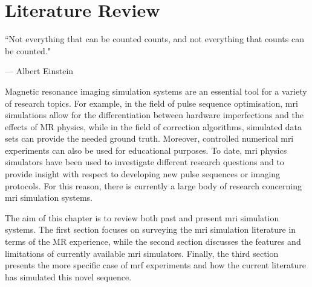 \chapter{Literature Review}
\label{chapterlabel2}
\epigraph{``Not everything that can be counted counts, and not everything that counts can
be counted."}{--- \textup{Albert Einstein}}

Magnetic resonance imaging simulation systems are an essential tool for a variety of research topics.
For example, in the field of pulse sequence optimisation, \ac{mri} simulations allow for the differentiation between hardware imperfections and the effects of MR physics, 
while in the field of correction algorithms, simulated data sets can provide the needed ground truth.
Moreover, controlled numerical \ac{mri} experiments can also be used for educational purposes.
To date, \ac{mri} physics simulators have been used to investigate different research questions and to provide insight with respect to developing new pulse sequences or imaging protocols.
For this reason, there is currently a large body of research concerning \ac{mri} simulation systems.

\hfill

The aim of this chapter is to review both past and present \ac{mri} simulation systems.
The first section focuses on surveying the \ac{mri} simulation literature in terms of the MR experience, while the second section discusses the features and limitations of currently available \ac{mri} simulators.
Finally, the third section presents the more specific case of \ac{mrf} experiments and how the current literature has simulated this novel sequence.

\hfill





\hfill



%
\hfill


